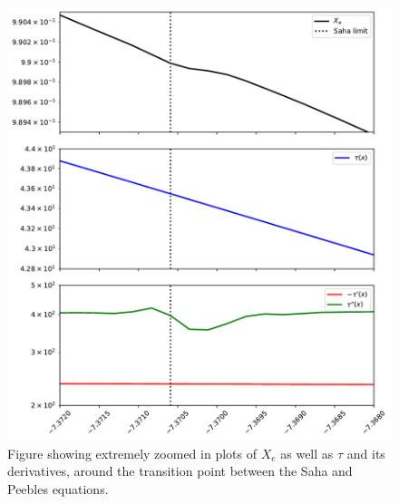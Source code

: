 \documentclass[10pt, a4paper]{article}
\begin{document}
\begin{figure}[H]
    \centering
    \includegraphics[scale=0.5]{../m2_figs/num_stab.pdf}
    \caption{Figure showing extremely zoomed in plots of $X_e$ as well as $\tau$ and its derivatives, around the transition point between the Saha and Peebles equations.}
    \label{fig:num_stab}
\end{figure}




\end{document}

